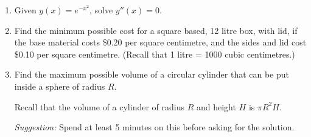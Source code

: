 \documentclass[12pt]{article}
\begin{document}
\begin{enumerate}
   \vspace{3cm}
   
   
   \item Given $y(x)=e^{-x^2}$, solve $y''(x)=0$.
   
   \vspace{5cm}
   
   \item Find the minimum possible cost for a square based, 12 litre box, with lid, if the base material costs \$0.20 per square centimetre, and the sides and lid cost \$0.10 per square centimetre. (Recall that 1 litre = 1000 cubic centimetres.)

  \newpage
  
  \item Find the maximum possible volume of a circular cylinder that can be put inside a sphere of radius $R$.
  
  Recall that the volume of a cylinder of radius $R$ and height $H$ is $\pi R^2H$.
  
  \medskip
  
  \textit{Suggestion:} Spend at least 5 minutes on this before asking for the solution.
    \end{enumerate}
\end{document}
